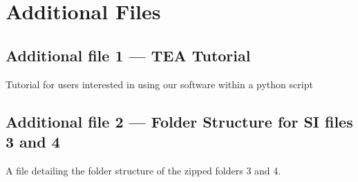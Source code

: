 %
%

\section*{Additional Files}
  \subsection*{Additional file 1 --- TEA Tutorial}
    Tutorial for users interested in using our software within a python script
  \subsection*{Additional file 2 --- Folder Structure for SI files 3 and 4}
    A file detailing the folder structure of the zipped folders 3 and 4.
